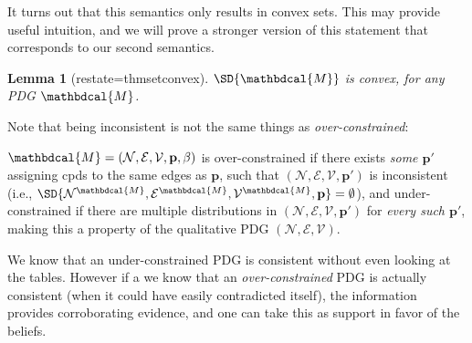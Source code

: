 \documentclass[letterpaper]{article} %
\theoremstyle{plain}
\newtheorem{lemma}[theorem]{Lemma}
\theoremstyle{definition}
\theoremstyle{remark}
\newcommand\mat[1]{\mathbf{#1}}
\newcommand{\notation}[2][]{#1}
\renewcommand{\notation}[2][]{{\color{notationcolor} #2}}
\newcommand{\V}{\mathcal V}
\newcommand{\N}{\mathcal N}
\newcommand{\Ed}{\mathcal E}
\newcommand{\pdgvars}[1][]{(\N#1, \Ed#1, \V#1, \mat p#1, \beta#1)}
\newcommand{\dg}[1]{\mathbdcal{#1}}
\begin{document}
	\begin{vfull}
		It turns out that this semantics only results in convex sets. This may provide useful intuition, and we will prove a stronger version of this statement that corresponds to our second semantics.
		\begin{lemma}[restate=thmsetconvex] 
			\label{prop:convex}
			$\SD{\dg M}$ is convex, for any PDG $\dg M$.
		\end{lemma}
	
		Note that being inconsistent is not the same things as \emph{over-constrained}: 	
		\begin{defn}
			$\dg M = \pdgvars[]$ is over-constrained if there exists
			  \emph{some $\mat p'$} assigning cpds to the same edges as
			  $\mat p$, such that $(\N, \Ed, \V, \mat p')$ is inconsistent
			  \notation{(i.e., $\SD{\N^\dg M, \Ed^\dg M, \V^\dg M, \mat p}
				= \emptyset$)}, and under-constrained if there are
			  multiple distributions in $(\N, \Ed, \V, \mat p')$ for
			  \emph{every such $\mat p'$}, making this a property of the
			  qualitative PDG $(\N, \Ed, \V)$.  
		\end{defn}

		We know that an under-constrained PDG is consistent without even looking at the tables. However if a we know that an \emph{over-constrained} PDG is actually consistent (when it could have easily contradicted itself), the information provides corroborating evidence, and one can take this as support in favor of the beliefs. 
	\end{vfull}
        
\end{document}
